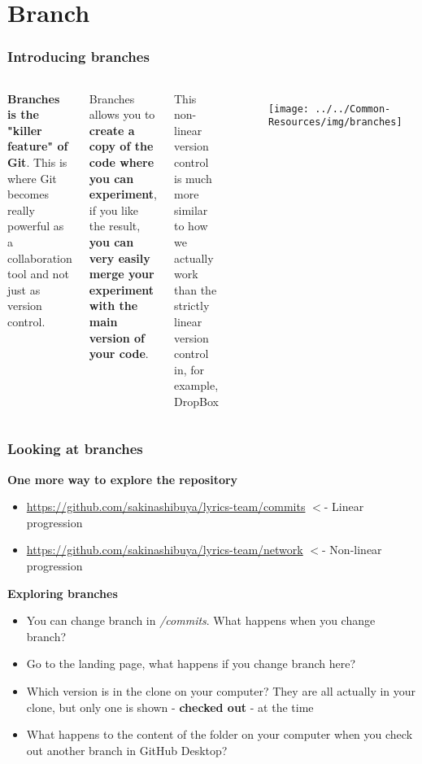 \documentclass[aspectratio=169]{beamer} %
\newcommand{\trainingURL}[1]{{\color{blue}\url{#1}}}
\newcommand{\traininerUsername}{sakinashibuya}
\newcommand{\repoName}{\traininerUsername/lyrics-team}
\newcommand{\trainingRepoURL}[1]{\trainingURL{https://github.com/\repoName #1}}
\begin{document}
\section{Branch}

\begin{frame}
\frametitle{Introducing branches}

	\begin{columns}[c]

		\textbf{Branches is the "killer feature" of Git}. This is where Git becomes really powerful as a collaboration tool and not just as version control.

		\vspace{.25cm}

		Branches allows you to \textbf{create a copy of the code where you can experiment}, if you like the result, \textbf{you can very easily merge your experiment with the main version of your code}.

		\vspace{.25cm}

		This non-linear version control is much more similar to how we actually work than the strictly linear version control in, for example, DropBox

		\begin{figure}
			\centering
			\texttt{[image: ../../Common-Resources/img/branches]}
			\label{fig:branches}
		\end{figure}

	\end{columns}

\end{frame}

\begin{frame}
\frametitle{Looking at branches}


	\textbf{One more way to explore the repository}
	\begin{itemize}
		\item \trainingRepoURL{/commits} $<$- Linear progression
		\item \trainingRepoURL{/network} $<$- Non-linear progression
	\end{itemize}

	\vspace{.1cm}

	\textbf{Exploring branches}
	\begin{itemize}
		\item You can change branch in \textit{/commits}. What happens when you change branch?
		\item Go to the landing page, what happens if you change branch here?
		\item Which version is in the clone on your computer? They are all actually in your clone, but only one is shown - \textbf{checked out} - at the time
		\item What happens to the content of the folder on your computer when you check out another branch in GitHub Desktop?
	\end{itemize}

\end{frame}
\end{document}
